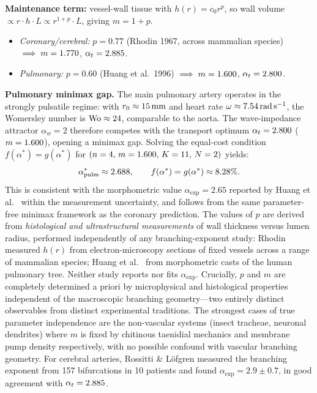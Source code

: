 \documentclass[11pt,a4paper]{article}
\theoremstyle{remark}
\begin{document}
\noindent\textbf{Maintenance term:} vessel-wall tissue with $h(r) = c_0 r^p$, so wall volume $\propto r \cdot h \cdot L \propto r^{1+p} \cdot L$, giving $m = 1+p$.
\begin{itemize}
    \item \textit{Coronary/cerebral:} $p = 0.77$ (Rhodin 1967, across mammalian species) $\implies m = 1.770{}$, $\alpha_t = 2.885{}$.
    \item \textit{Pulmonary:} $p = 0.60$ (Huang et al.\ 1996) $\implies m = 1.600{}$, $\alpha_t = 2.800{}$.
\end{itemize}

\noindent\textbf{Pulmonary minimax gap.} The main pulmonary artery operates in the
strongly pulsatile regime: with $r_0 \approx 15{}\,\mathrm{mm}$ and heart
rate $\omega \approx 7.54{}\,\mathrm{rad\,s^{-1}}$, the Womersley number is
$\mathrm{Wo} \approx 24{}$, comparable to the aorta. The wave-impedance
attractor $\alpha_w = 2$ therefore competes with the transport optimum
$\alpha_t = 2.800{}$ ($m = 1.600{}$), opening a minimax gap. Solving the
equal-cost condition $f(\alpha^*) = g(\alpha^*)$ for $(n=4,\, m=1.600{},\,
K=11,\, N=2)$ yields:
\begin{equation}
\alpha^*_{\mathrm{pulm}} \approx 2.688{}, \qquad
f(\alpha^*) = g(\alpha^*) \approx 8.28{}\%.
\end{equation}
This is consistent with the morphometric value $\alpha_{\exp} = 2.65$
reported by Huang et al.~\cite{huang1996} within the measurement
uncertainty, and follows from the same parameter-free minimax framework
as the coronary prediction.
The values of $p$ are derived from \emph{histological and ultrastructural
measurements} of wall thickness versus lumen radius, performed independently of
any branching-exponent study: Rhodin~\cite{rhodin1967} measured $h(r)$ from
electron-microscopy sections of fixed vessels across a range of mammalian
species; Huang et al.~\cite{huang1996} from morphometric casts of the human
pulmonary tree. Neither study reports nor fits $\alpha_{\exp}$. Crucially, $p$
and $m$ are completely determined a priori by microphysical and histological
properties independent of the macroscopic branching geometry---two entirely
distinct observables from distinct experimental traditions. The strongest cases
of true parameter independence are the non-vascular systems (insect tracheae,
neuronal dendrites) where $m$ is fixed by chitinous taenidial mechanics and
membrane pump density respectively, with no possible confound with vascular
branching geometry. For cerebral arteries, Rossitti \& L\"{o}fgren
\cite{rossitti1993} measured the branching exponent from 157 bifurcations in 10
patients and found $\alpha_{\exp} = 2.9 \pm 0.7$, in good agreement with
$\alpha_t = 2.885{}$.
\end{document}
